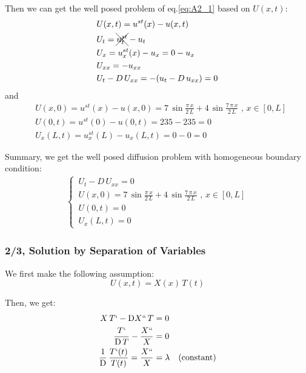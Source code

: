 \documentclass[../main.tex]{subfiles}
\begin{document}
Then we can get the well posed problem of eq.\ref{eq:A2_1} based on $U(x,t)$:
\begin{align}
    & U(x,t) = u^{st}(x) - u(x,t) \\
    & U_t = \xcancel{u^{st}_t} - u_t \\
    & U_x = u^{st}_x(x) - u_x = 0 - u_x \\
    & U_{xx} = - u_{xx} \\
    & U_t - D \, U_{xx} = - (u_t - D \, u_{xx}) = 0
\end{align}
and
\begin{align}
    & U(x,0) = u^{st}(x) - u(x,0) = 7 \, \sin{\frac{\pi \, x}{2 \, L}} + 4 \, \sin{\frac{7 \, \pi \, x}{2 \, L}} \text{ ,  } x \in [0,L] \\
    & U(0,t) = u^{st}(0) - u(0,t) = 235 - 235 = 0 \\
    & U_x(L,t) = u^{st}_x(L) - u_x(L,t) = 0 - 0 = 0
\end{align}

Summary, we get the well posed diffusion problem with homogeneous boundary condition:
\begin{align}
    \begin{cases}
        \, U_t - D \, U_{xx} = 0 \\
        \, U(x,0) = 7 \, \sin{\frac{\pi \, x}{2 \, L}} + 4 \, \sin{\frac{7 \, \pi \, x}{2 \, L}} \text{ ,  } x \in [0,L] \\
        \, U(0,t) = 0 \\
        \, U_x(L,t) = 0
    \end{cases}
\end{align}

\subsubsection{2/3, Solution by Separation of Variables}

We first make the following assumption:
\begin{equation} \label{eq:A2_14}
    U(x,t) = X(x) \, T(t)
\end{equation}

Then, we get:
\begin{align}
    X \, T` - \mathrm{D} X`` \, T &= 0 \nonumber \\
    \frac{T`}{\mathrm{D} \, T} - \frac{X``}{X} &= 0 \nonumber \\
    \frac{1}{\mathrm{D}} \, \frac{T`(t)}{T(t)} = \frac{X``}{X} &= \lambda \quad \text{(constant)} \label{eq:A2_15}
\end{align}
\end{document}
